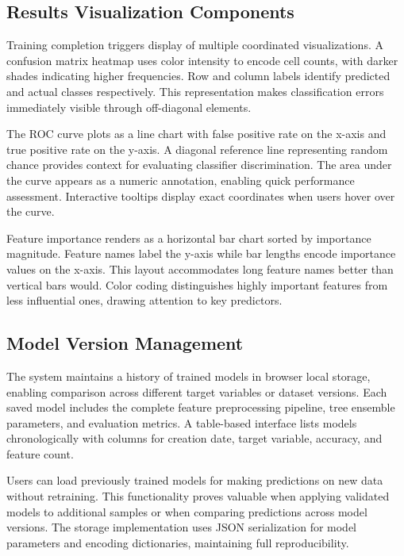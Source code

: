 \documentclass[conference]{IEEEtran}
\begin{document}
\subsection{Results Visualization Components}

Training completion triggers display of multiple coordinated visualizations. A confusion matrix heatmap uses color intensity to encode cell counts, with darker shades indicating higher frequencies. Row and column labels identify predicted and actual classes respectively. This representation makes classification errors immediately visible through off-diagonal elements.

The ROC curve plots as a line chart with false positive rate on the x-axis and true positive rate on the y-axis. A diagonal reference line representing random chance provides context for evaluating classifier discrimination. The area under the curve appears as a numeric annotation, enabling quick performance assessment. Interactive tooltips display exact coordinates when users hover over the curve.

Feature importance renders as a horizontal bar chart sorted by importance magnitude. Feature names label the y-axis while bar lengths encode importance values on the x-axis. This layout accommodates long feature names better than vertical bars would. Color coding distinguishes highly important features from less influential ones, drawing attention to key predictors.

\subsection{Model Version Management}

The system maintains a history of trained models in browser local storage, enabling comparison across different target variables or dataset versions. Each saved model includes the complete feature preprocessing pipeline, tree ensemble parameters, and evaluation metrics. A table-based interface lists models chronologically with columns for creation date, target variable, accuracy, and feature count.

Users can load previously trained models for making predictions on new data without retraining. This functionality proves valuable when applying validated models to additional samples or when comparing predictions across model versions. The storage implementation uses JSON serialization for model parameters and encoding dictionaries, maintaining full reproducibility.
\end{document}
